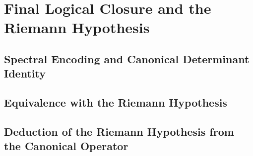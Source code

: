 \section{Final Logical Closure and the Riemann Hypothesis}
\label{sec:logical_closure}





\subsection{Spectral Encoding and Canonical Determinant Identity}










\subsection{Equivalence with the Riemann Hypothesis}







\subsection{Deduction of the Riemann Hypothesis from the Canonical Operator}




